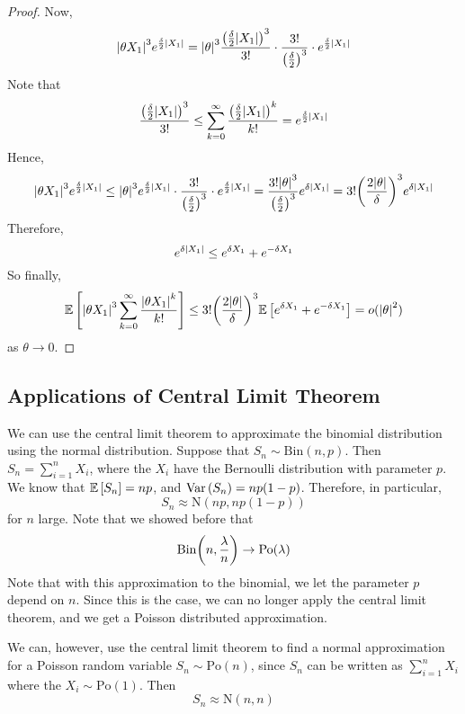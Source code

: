 \documentclass{article}
\begin{document}
\begin{proof}
	Now,
	\[ \abs{\theta X_1}^3 e^{\frac{\delta}{2}\abs{X_1}} = \abs{\theta}^3 \frac{\qty(\frac{\delta}{2}\abs{X_1})^3}{3!} \cdot \frac{3!}{\qty(\frac{\delta}{2})^3} \cdot e^{\frac{\delta}{2}\abs{X_1}} \]
	Note that
	\[ \frac{\qty(\frac{\delta}{2}\abs{X_1})^3}{3!} \leq \sum_{k=0}^\infty \frac{\qty(\frac{\delta}{2}\abs{X_1})^k}{k!} = e^{\frac{\delta}{2}\abs{X_1}} \]
	Hence,
	\[ \abs{\theta X_1}^3 e^{\frac{\delta}{2}\abs{X_1}} \leq \abs{\theta}^3 e^{\frac{\delta}{2}\abs{X_1}} \cdot \frac{3!}{\qty(\frac{\delta}{2})^3} \cdot e^{\frac{\delta}{2}\abs{X_1}} = \frac{3!\abs{\theta}^3}{\qty(\frac{\delta}{2})^3}e^{\delta\abs{X_1}} = 3!\qty(\frac{2\abs{\theta}}{\delta})^3 e^{\delta \abs{X_1}} \]
	Therefore,
	\[ e^{\delta \abs{X_1}} \leq e^{\delta X_1} + e^{-\delta X_1} \]
	So finally,
	\[ \mathbb{E}\left[{\abs{\theta X_1}^3 \sum_{k=0}^\infty \frac{\abs{\theta X_1}^k}{k!}}\right] \leq 3!\qty(\frac{2\abs{\theta}}{\delta})^3 \mathbb{E}\left[{e^{\delta X_1} + e^{-\delta X_1}}\right] = o(\abs{\theta}^2) \]
	as $\theta \to 0$.
\end{proof}

\subsection{Applications of Central Limit Theorem}
We can use the central limit theorem to approximate the binomial distribution using the normal distribution. Suppose that $S_n \sim \mathrm{Bin}(n, p)$. Then $S_n = \sum_{i=1}^n X_i$, where the $X_i$ have the Bernoulli distribution with parameter $p$. We know that $\mathbb{E}\left[{S_n}\right] = np$, and $\operatorname{Var}\left({S_n}\right) = np(1-p)$. Therefore, in particular,
\[ S_n \approx \mathrm{N}(np, np(1-p)) \]
for $n$ large. Note that we showed before that
\[ \mathrm{Bin}\qty(n, \frac{\lambda}{n}) \to \mathrm{Po}(\lambda) \]
Note that with this approximation to the binomial, we let the parameter $p$ depend on $n$. Since this is the case, we can no longer apply the central limit theorem, and we get a Poisson distributed approximation.

We can, however, use the central limit theorem to find a normal approximation for a Poisson random variable $S_n \sim \mathrm{Po}(n)$, since $S_n$ can be written as $\sum_{i=1}^n X_i$ where the $X_i \sim \mathrm{Po}(1)$. Then
\[ S_n \approx \mathrm{N}(n, n) \]
\end{document}
